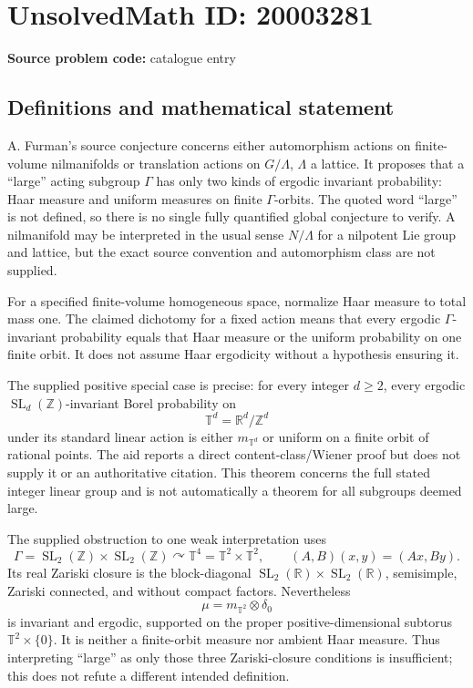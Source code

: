 \documentclass[11pt]{article}
\newcommand{\Z}{\mathbb{Z}}
\newcommand{\R}{\mathbb{R}}
\begin{document}
\section*{UnsolvedMath ID: 20003281}
\textbf{Source problem code:} catalogue entry
\subsection{Definitions and mathematical statement}
A. Furman's source conjecture concerns either automorphism actions on finite-volume nilmanifolds or translation actions on \(G/\Lambda\), \(\Lambda\) a lattice. It proposes that a ``large'' acting subgroup \(\Gamma\) has only two kinds of ergodic invariant probability: Haar measure and uniform measures on finite \(\Gamma\)-orbits. The quoted word ``large'' is not defined, so there is no single fully quantified global conjecture to verify. A nilmanifold may be interpreted in the usual sense \(N/\Lambda\) for a nilpotent Lie group and lattice, but the exact source convention and automorphism class are not supplied.

For a specified finite-volume homogeneous space, normalize Haar measure to total mass one. The claimed dichotomy for a fixed action means that every ergodic \(\Gamma\)-invariant probability equals that Haar measure or the uniform probability on one finite orbit. It does not assume Haar ergodicity without a hypothesis ensuring it.

The supplied positive special case is precise: for every integer \(d\geq2\), every ergodic \(\operatorname{SL}_d(\Z)\)-invariant Borel probability on
\[
 \mathbb T^d=\R^d/\Z^d
\]
under its standard linear action is either \(m_{\mathbb T^d}\) or uniform on a finite orbit of rational points. The aid reports a direct content-class/Wiener proof but does not supply it or an authoritative citation. This theorem concerns the full stated integer linear group and is not automatically a theorem for all subgroups deemed large.

The supplied obstruction to one weak interpretation uses
\[
 \Gamma=\operatorname{SL}_2(\Z)\times\operatorname{SL}_2(\Z)
 \curvearrowright\mathbb T^4=\mathbb T^2\times\mathbb T^2,
 \qquad(A,B)(x,y)=(Ax,By).
\]
Its real Zariski closure is the block-diagonal \(\operatorname{SL}_2(\R)\times\operatorname{SL}_2(\R)\), semisimple, Zariski connected, and without compact factors. Nevertheless
\[
 \mu=m_{\mathbb T^2}\otimes\delta_0
\]
is invariant and ergodic, supported on the proper positive-dimensional subtorus \(\mathbb T^2\times\{0\}\). It is neither a finite-orbit measure nor ambient Haar measure. Thus interpreting ``large'' as only those three Zariski-closure conditions is insufficient; this does not refute a different intended definition.
\end{document}
